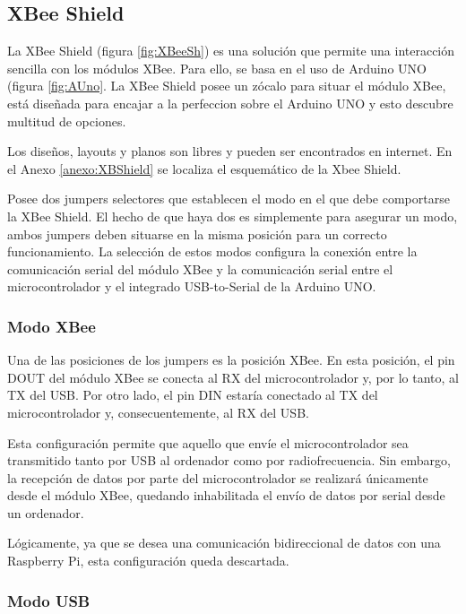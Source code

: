 \subsection{XBee Shield}

La XBee Shield (figura \ref{fig:XBeeSh}) es una solución que permite una interacción sencilla con los módulos XBee. Para ello, se basa en el uso de Arduino UNO (figura \ref{fig:AUno}. La XBee Shield posee un zócalo para situar el módulo XBee, está diseñada para encajar a la perfeccion sobre el Arduino UNO y esto descubre multitud de opciones.

Los diseños, layouts y planos son libres y pueden ser encontrados en internet. En el Anexo \ref{anexo:XBShield} se localiza el esquemático de la Xbee Shield.

Posee dos jumpers selectores que establecen el modo en el que debe comportarse la XBee Shield. El hecho de que haya dos es simplemente para asegurar un modo, ambos jumpers deben situarse en la misma posición para un correcto funcionamiento. La selección de estos modos configura la conexión entre la comunicación serial del módulo XBee y la comunicación serial entre el microcontrolador y el integrado USB-to-Serial de la Arduino UNO.

\subsubsection{Modo XBee}

Una de las posiciones de los jumpers es la posición XBee. En esta posición, el pin DOUT del módulo XBee se conecta al RX del microcontrolador y, por lo tanto, al TX del USB. Por otro lado, el pin DIN estaría conectado al TX del microcontrolador y, consecuentemente, al RX del USB.

Esta configuración permite que aquello que envíe el microcontrolador sea transmitido tanto por USB al ordenador como por radiofrecuencia. Sin embargo, la recepción de datos por parte del microcontrolador se realizará únicamente desde el módulo XBee, quedando inhabilitada el envío de datos por serial desde un ordenador.

Lógicamente, ya que se desea una comunicación bidireccional de datos con una Raspberry Pi, esta configuración queda descartada.

\subsubsection{Modo USB}\label{subsubsec:USBXB}

